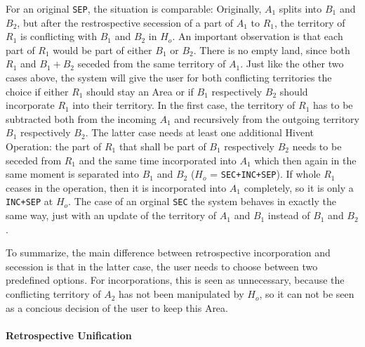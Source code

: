 For an original \texttt{SEP}, the situation is comparable: Originally, $A_1$ splits into $B_1$ and $B_2$, but after the restrospective secession of a part of $A_1$ to $R_1$, the territory of $R_1$ is conflicting with $B_1$ and $B_2$ in $H_o$. An important observation is that each part of $R_1$ would be part of either $B_1$ or $B_2$. There is no empty land, since both $R_1$ and $B_1+B_2$ seceded from the same territory of $A_1$. Just like the other two cases above, the system will give the user for both conflicting territories the choice if either $R_1$ should stay an Area or if $B_1$ respectively $B_2$ should incorporate $R_1$ into their territory. In the first case, the territory of $R_1$ has to be subtracted both from the incoming $A_1$ and recursively from the outgoing territory $B_1$ respectively $B_2$. The latter case needs at least one additional Hivent Operation: the part of $R_1$ that shall be part of $B_1$ respectively $B_2$ needs to be seceded from $R_1$ and the same time incorporated into $A_1$ which then again in the same moment is separated into $B_1$ and $B_2$ ($H_o$ = \texttt{SEC+INC+SEP}). If whole $R_1$ ceases in the operation, then it is incorporated into $A_1$ completely, so it is only a \texttt{INC+SEP} at $H_o$. The case of an orginal \texttt{SEC} the system behaves in exactly the same way, just with an update of the territory of $A_1$ and $B_1$ instead of $B_1$ and $B_2$.

To summarize, the main difference between retrospective incorporation and secession is that in the latter case, the user needs to choose between two predefined options. For incorporations, this is seen as unnecessary, because the conflicting territory of $A_2$ has not been manipulated by $H_o$, so it can not be seen as a concious decision of the user to keep this Area.


\paragraph{Retrospective Unification} %
\label{par:retrospective_unification}

